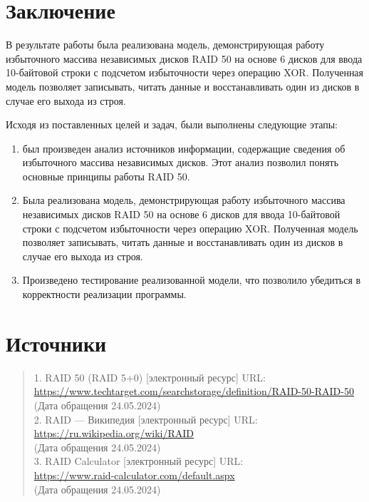 \documentclass[10pt,a4paper,final]{article} %
\begin{document}
\newpage
\section*{Заключение}

В результате работы была реализована модель, демонстрирующая работу избыточного массива независимых дисков RAID 50 на основе 6 дисков для ввода 10-байтовой строки с подсчетом избыточности через операцию XOR. Полученная модель позволяет записывать, читать данные и восстанавливать один из дисков в случае его выхода из строя.

Исходя из поставленных целей и задач, были выполнены следующие этапы:
\begin{enumerate}
	\item был произведен анализ источников информации, содержащие сведения об избыточного массива независимых дисков. Этот анализ позволил понять основные принципы работы RAID 50.
	\item Была реализована модель, демонстрирующая работу избыточного массива независимых дисков RAID 50 на основе 6 дисков для ввода 10-байтовой строки с подсчетом избыточности через операцию XOR. Полученная модель позволяет записывать, читать данные и восстанавливать один из дисков в случае его выхода из строя.
	\item  Произведено тестирование реализованной модели, что позволило убедиться в корректности реализации программы.
\end{enumerate}


\newpage
\section* {Источники}
\begin{quote}
	1. RAID 50 (RAID 5+0) [электронный ресурс] URL:\\ \href{https://www.techtarget.com/searchstorage/definition/RAID-50-RAID-50}{https://www.techtarget.com/searchstorage/definition/RAID-50-RAID-50}\\
	(Дата обращения 24.05.2024)\\
	2. RAID — Википедия [электронный ресурс] URL:\\
	\href{https://ru.wikipedia.org/wiki/RAID}{https://ru.wikipedia.org/wiki/RAID} \\
	(Дата обращения 24.05.2024)\\
	3. RAID Calculator [электронный ресурс] URL:\\ \href{https://www.raid-calculator.com/default.aspx}{https://www.raid-calculator.com/default.aspx} \\
	(Дата обращения 24.05.2024)\\
\end{quote}
\end{document}
